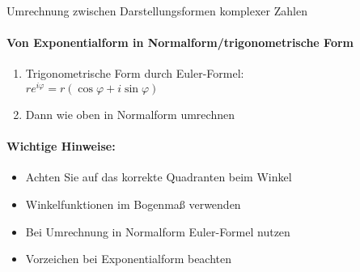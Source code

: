 \begin{KR}{Umrechnung zwischen Darstellungsformen komplexer Zahlen}
\paragraph{Von Exponentialform in Normalform/trigonometrische Form}
\begin{enumerate}
   \item Trigonometrische Form durch Euler-Formel:\\
   $re^{i\varphi} = r(\cos\varphi + i\sin\varphi)$
   \item Dann wie oben in Normalform umrechnen
\end{enumerate}

\paragraph{Wichtige Hinweise:}
\begin{itemize}
   \item Achten Sie auf das korrekte Quadranten beim Winkel
   \item Winkelfunktionen im Bogenmaß verwenden
   \item Bei Umrechnung in Normalform Euler-Formel nutzen
   \item Vorzeichen bei Exponentialform beachten
\end{itemize}
\end{KR}

